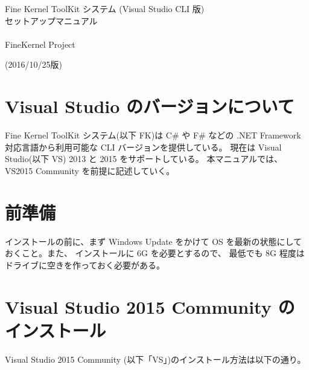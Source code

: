 \documentclass[a4paper]{jsarticle}
\begin{document}
\begin{center}
\begin{Large}
Fine Kernel ToolKit システム (Visual Studio CLI 版) \\
	セットアップマニュアル \\ ~ \\
FineKernel Project \\
\end{Large}
(2016/10/25版)
\end{center}

\section{Visual Studio のバージョンについて}
Fine Kernel ToolKit システム(以下 FK)は 
C\# や F\# などの .NET Framework 対応言語から利用可能な CLI バージョンを提供している。
現在は Visual Studio(以下 VS) 2013 と 2015 をサポートしている。
本マニュアルでは、VS2015 Community を前提に記述していく。

\section{前準備}

インストールの前に、まず Windows Update をかけて
OS を最新の状態にしておくこと。また、
インストールに 6G を必要とするので、
最低でも 8G 程度はドライブに空きを作っておく必要がある。

\section{Visual Studio 2015 Community のインストール}
Visual Studio 2015 Community (以下「VS」)のインストール方法は以下の通り。
\end{document}
